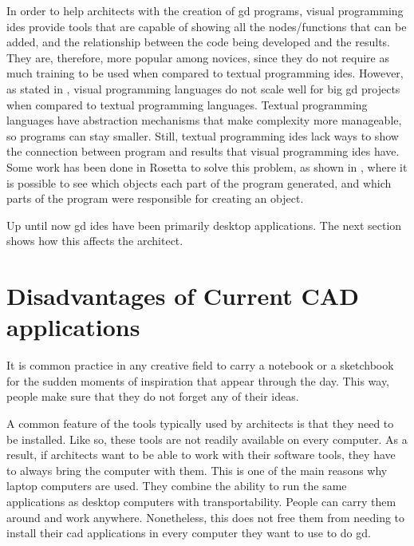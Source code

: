 In order to help architects with the creation of \gls{gd} programs, visual programming \glspl{ide} provide tools that are capable of showing all the nodes/functions that can be added, and the relationship between the code being developed and the results.
They are, therefore, more popular among novices, since they do not require as much training to be used when compared to textual programming \glspl{ide}.
However, as stated in \cite{leitao2012programming}, visual programming languages do not scale well for big \gls{gd} projects when compared to textual programming languages.
Textual programming languages have abstraction mechanisms that make complexity more manageable, so programs can stay smaller.
Still, textual programming \glspl{ide} lack ways to show the connection between program and results that visual programming \glspl{ide} have.
Some work has been done in Rosetta to solve this problem, as shown in \cite{Leitao2014illustrated}, where it is possible to see which objects each part of the program generated, and which parts of the program were responsible for creating an object.

Up until now \gls{gd} \glspl{ide} have been primarily desktop applications.
The next section shows how this affects the architect.


\section{Disadvantages of Current CAD applications}
It is common practice in any creative field to carry a notebook or a sketchbook for the sudden moments of inspiration that appear through the day.
This way, people make sure that they do not forget any of their ideas.

A common feature of the tools typically used by architects is that they need to be installed.
Like so, these tools are not readily available on every computer.
As a result, if architects want to be able to work with their software tools, they have to always bring the computer with them.
This is one of the main reasons why laptop computers are used.
They combine the ability to run the same applications as desktop computers with transportability.
People can carry them around and work anywhere.
Nonetheless, this does not free them from needing to install their \gls{cad} applications in every computer they want to use to do \gls{gd}.

